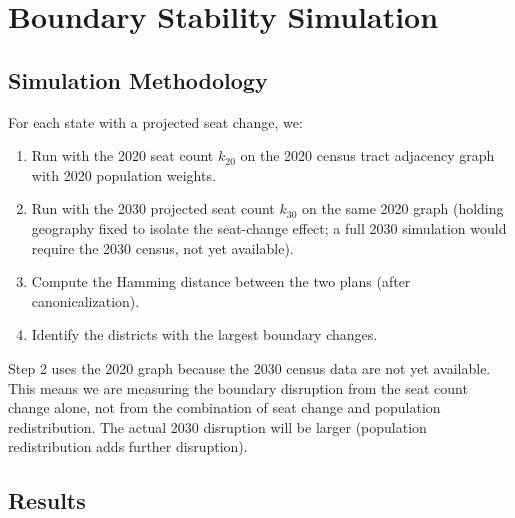 \section{Boundary Stability Simulation}
\label{sec:boundary}

\subsection{Simulation Methodology}

For each state with a projected seat change, we:
\begin{enumerate}
\item Run \ar{} with the 2020 seat count $k_{20}$ on the 2020 census
      tract adjacency graph with 2020 population weights.
\item Run \ar{} with the 2030 projected seat count $k_{30}$ on the same
      2020 graph (holding geography fixed to isolate the seat-change effect;
      a full 2030 simulation would require the 2030 census, not yet available).
\item Compute the Hamming distance between the two plans (after canonicalization).
\item Identify the districts with the largest boundary changes.
\end{enumerate}

Step 2 uses the 2020 graph because the 2030 census data are not yet available.
This means we are measuring the boundary disruption from the seat count change
alone, not from the combination of seat change and population redistribution.
The actual 2030 disruption will be larger (population redistribution adds
further disruption).

\subsection{Results}

